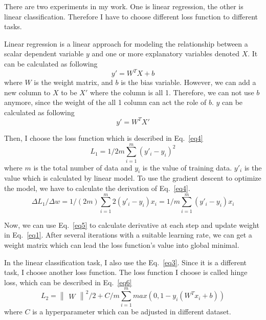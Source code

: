 \documentclass[journal, a4paper]{IEEEtran}
\begin{document}
There are two experiments in my work. One is linear regression, the other is linear classification. Therefore I have to choose different loss function to different tasks.

Linear regression is a linear approach for modeling the relationship between a scalar dependent variable $y$ and one or more explanatory variables denoted $X$. It can be calculated as following
\begin{equation}
y' = W^TX+b \label{eq2}
\end{equation}
where $W$ is the weight matrix, and $b$ is the bias variable. However, we can add a new column to $X$ to be $X'$ where the column is all 1. Therefore, we can not use $b$ anymore, since the weight of the all 1 column can act the role of $b$. $y$ can be calculated as following
\begin{equation}
y' = W^TX' \label{eq3}
\end{equation}


Then, I choose the loss function which is described in Eq.~\eqref{eq4}
\begin{equation}
L_1 = 1/{2m} \sum_{i=1}^m(y'_i-y_i)^2 \label{eq4}
\end{equation}
where $m$ is the total number of data and $y_i$ is the value of training data. $y'_i$ is the value which is calculated by linear model. To use the gradient descent to optimize the model, we have to calculate the derivation of Eq.~\eqref{eq4}.
\begin{equation}
\Delta L_1 / \Delta w = 1/(2m) \sum_{i=1}^m 2(y'_i-y_i)x_i = 1/m \sum_{i=1}^m (y'_i-y_i)x_i
\label{eq5}
\end{equation}

Now, we can use Eq.~\eqref{eq5} to calculate derivative at each step and update weight in Eq.~\eqref{eq1}. After several iterations with a suitable learning rate, we can get a weight matrix which can lead the loss function's value into global minimal.

In the linear classification task, I also use the Eq.~\eqref{eq3}. Since it is a different task, I choose another loss function. The loss function I choose is called hinge loss, which can be described in Eq.~\eqref{eq6}
\begin{equation}
L_2 = \begin{Vmatrix}W\end{Vmatrix}^2/2 + C/m \sum_{i=1}^m max(0, 1-y_i(W^Tx_i+b))
\label{eq6}
\end{equation}
where $C$ is a hyperparameter which can be adjusted in different dataset.
\end{document}
